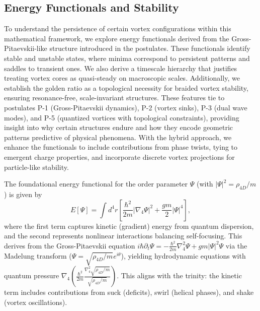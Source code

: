 \medskip
\noindent
{}
\medskip

\subsection{Energy Functionals and Stability}

To understand the persistence of certain vortex configurations within this mathematical framework, we explore energy functionals derived from the Gross-Pitaevskii-like structure introduced in the postulates. These functionals identify stable and unstable states, where minima correspond to persistent patterns and saddles to transient ones. We also derive a timescale hierarchy that justifies treating vortex cores as quasi-steady on macroscopic scales. Additionally, we establish the golden ratio as a topological necessity for braided vortex stability, ensuring resonance-free, scale-invariant structures. These features tie to postulates P-1 (Gross-Pitaevskii dynamics), P-2 (vortex sinks), P-3 (dual wave modes), and P-5 (quantized vortices with topological constraints), providing insight into why certain structures endure and how they encode geometric patterns predictive of physical phenomena. With the hybrid approach, we enhance the functionals to include contributions from phase twists, tying to emergent charge properties, and incorporate discrete vortex projections for particle-like stability.

The foundational energy functional for the order parameter $\Psi$ (with $|\Psi|^2 = \rho_{4D}/m$) is given by
\begin{equation}
E[\Psi] = \int d^4 r \left[ \frac{\hbar^2}{2m} |\nabla_4 \Psi|^2 + \frac{g m}{2} |\Psi|^4 \right],
\end{equation}
where the first term captures kinetic (gradient) energy from quantum dispersion, and the second represents nonlinear interactions balancing self-focusing. This derives from the Gross-Pitaevskii equation $i \hbar \partial_t \Psi = -\frac{\hbar^2}{2 m} \nabla_4^2 \Psi + g m |\Psi|^2 \Psi$ via the Madelung transform ($\Psi = \sqrt{\rho_{4D}/m} e^{i \theta}$), yielding hydrodynamic equations with quantum pressure $\nabla_4 \left( \frac{\hbar^2}{2 m} \frac{\nabla_4^2 \sqrt{\rho_{4D}/m}}{\sqrt{\rho_{4D}/m}} \right)$. This aligns with the trinity: the kinetic term includes contributions from suck (deficits), swirl (helical phases), and shake (vortex oscillations).

